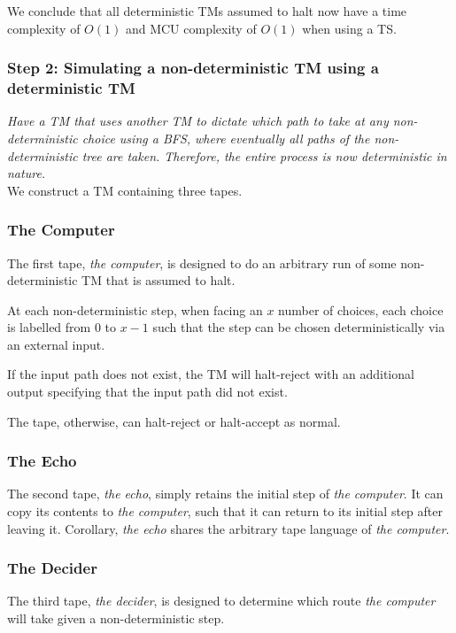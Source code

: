 \documentclass{report}
\begin{document}
We conclude that all deterministic TMs assumed to halt now have a time complexity of $O(1)$ and MCU complexity of $O(1)$ when using a TS.

\subsubsection{Step 2: Simulating a non-deterministic TM using a deterministic TM}

\textit{Have a TM that uses another TM to dictate which path to take at any non-deterministic choice using a BFS, where eventually all paths of the non-deterministic tree are taken. Therefore, the entire process is now deterministic in nature.}\\

We construct a TM containing three tapes.

\subsubsection{The Computer}

The first tape, \textit{the computer}, is designed to do an arbitrary run of some non-deterministic TM that is assumed to halt.

At each non-deterministic step, when facing an $x$ number of choices, each choice is labelled from 0 to $x-1$ such that the step can be chosen deterministically via an external input.

If the input path does not exist, the TM will halt-reject with an additional output specifying that the input path did not exist.

The tape, otherwise, can halt-reject or halt-accept as normal.

\subsubsection{The Echo}

The second tape, \textit{the echo}, simply retains the initial step of \textit{the computer}. It can copy its contents to \textit{the computer}, such that it can return to its initial step after leaving it. Corollary, \textit{the echo} shares the arbitrary tape language of \textit{the computer}.

\subsubsection{The Decider}

The third tape, \textit{the decider}, is designed to determine which route \textit{the computer} will take given a non-deterministic step.
\end{document}
